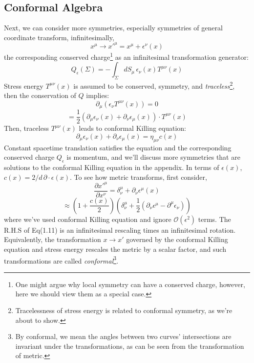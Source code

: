 \documentclass[12pt]{article}
\numberwithin{equation}{section}
\newcommand\<\langle
\renewcommand\>\rangle
\renewcommand\.{\cdot}
\begin{document}
\subsection{Conformal Algebra}
Next, we can consider more symmetries, especially symmetries of general coordinate transform, infinitesimally,
\begin{equation}
    x^{\mu}\rightarrow x'^{\mu} = x^{\mu} + \epsilon^{\nu}(x)
\end{equation}
the corresponding conserved charge\footnote{One might argue why local symmetry can have a conserved charge, however, here we should view them as a special case.} as an infinitesimal transformation generator:
\begin{equation}
    Q_{\epsilon}(\Sigma) = -\int_{\Sigma}{dS_{\mu}\,}\epsilon_{\nu}(x)T^{\mu\nu}(x)
\end{equation}
Stress energy $T^{\mu\nu}(x)$ is assumed to be conserved, symmetry, and \textit{traceless}\footnote{Tracelessness of stress energy is related to conformal symmetry, as we're about to show.}, then the conservation of $Q$ implies:
\[
    \partial_{\mu}(\epsilon_{\nu}T^{\mu\nu}(x)) = 0
\]
\[
    =\frac{1}{2}\left(\partial_{\mu}\epsilon_{\nu}(x)+\partial_{\nu}\epsilon_{\mu}(x)\right)\cdot T^{\mu\nu}(x)
\]
Then, traceless $T^{\mu\nu}(x)$ leads to conformal Killing equation:
\begin{equation}
    \partial_{\mu}\epsilon_{\nu}(x) + \partial_{\nu}\epsilon_{\mu}(x) = \eta_{\mu\nu}c(x)
\end{equation}
Constant spacetime translation satisfies the equation and the corresponding conserved charge $Q_{\epsilon}$ is momentum, and we'll discuss more symmetries that are solutions to the conformal Killing equation in the appendix. In terms of $\epsilon(x)$, $c(x) = 2/d\,\partial\cdot\epsilon(x)$. To see how metric transforms, first consider,
\[
    \frac{\partial x'^{\mu}}{\partial x^{\nu}} = \delta^{\mu}_{\nu} + \partial_{\nu}\epsilon^{\mu}(x)
\]
\begin{equation}
    \approx \left(1+\frac{c(x)}{2}\right)\left(\delta^{\mu}_{\nu} + \frac{1}{2}(\partial_{\nu}\epsilon^{\mu}-\partial^{\mu}\epsilon_{\nu})\right)
\end{equation}
where we've used conformal Killing equation and ignore $\mathcal{O}(\epsilon^2)$ terms. The R.H.S of Eq(1.11) is an infinitesimal rescaling times an infinitesimal rotation. Equivalently, the transformation $x\rightarrow x'$ governed by the conformal Killing equation and stress energy rescales the metric by a scalar factor, and such transformations are called \textit{conformal}\footnote{By conformal, we mean the angles between two curves' intersections are invariant under the transformations, as can be seen from the transformation of metric.}.
\end{document}
